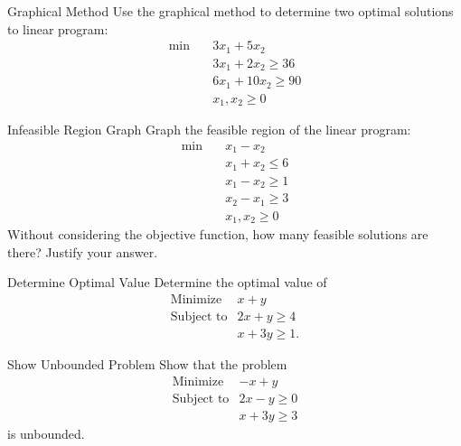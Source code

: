 \begin{ex}{Graphical Method}{}
Use the graphical method to determine two optimal solutions to linear program:
\begin{align*}
\min  \quad& 3x_1 + 5x_2\\
 & 3x_1 + 2x_2 \ge 36\\
 & 6x_1 + 10x_2 \geq 90\\
 & x_1, x_2 \geq 0
\end{align*}
\end{ex}

\begin{ex}{Infeasible Region Graph}{}\label{ex:infeasible}
Graph the feasible region of the linear program:
\begin{align*}
\min  \quad & x_1 - x_2\\
 & x_1 + x_2 \leq 6\\
 & x_1 - x_2 \geq 1\\
 & x_2 - x_1 \geq 3\\
 & x_1, x_2 \geq 0
\end{align*}
Without considering the objective function, how many feasible solutions are there?  Justify your answer.
\end{ex}

\begin{ex}{Determine Optimal Value}{}\label{ex:lp-optimal-value}
Determine the optimal value of
\[
\begin{array}{rl}
\text{Minimize} & x + y \\
\text{Subject to} &  2x + y \geq 4 \\
& x + 3y \geq 1.
\end{array}
\]
\exrefs{\S\ref{sec:graphical-approach}}
\end{ex}

\begin{ex}{Show Unbounded Problem}{}\label{ex:lp-unbounded}
Show that the problem
\[
\begin{array}{rl}
\text{Minimize} & -x + y \\
\text{Subject to} &  2x - y \geq 0 \\
& x + 3y \geq 3
\end{array}
\]
is unbounded.
\end{ex}

